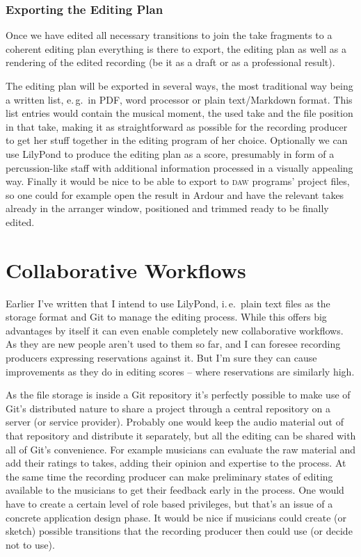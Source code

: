 \documentclass[11pt,a4paper]{article}
\begin{document}
\subsubsection{Exporting the Editing Plan}

Once we have edited all necessary transitions to join the take fragments to a
coherent editing plan everything is there to export, the editing plan as well as
a rendering of the edited recording (be it as a draft or as a professional
result).

The editing plan will be exported in several ways, the most traditional way
being a written list, e.\,g.\ in PDF, word processor or plain text/Markdown
format.
This list entries would contain the musical moment, the used take and the file
position in that take, making it as straightforward as possible for the
recording producer to get her stuff together in the editing program of her
choice.
Optionally we can use LilyPond to produce the editing plan as a score,
presumably in form of a percussion-like staff with additional information
processed in a visually appealing way.
Finally it would be nice to be able to export to \textsc{daw} programs' project
files, so one could for example open the result in Ardour and have the relevant
takes already in the arranger window, positioned and trimmed ready to be finally
edited.

\section{Collaborative Workflows}

Earlier I've written that I intend to use LilyPond, i.\,e.\ plain text files as
the storage format and Git to manage the editing process.
While this offers big advantages by itself it can even enable completely new
collaborative workflows.
As they are new people aren't used to them so far, and I can foresee recording
producers expressing reservations against it.
But I'm sure they can cause improvements as they do in editing scores -- where
reservations are similarly high.

As the file storage is inside a Git repository it's perfectly possible to make
use of Git's distributed nature to share a project through a central repository
on a server (or service provider).
Probably one would keep the audio material out of that repository and distribute
it separately, but all the editing can be shared with all of Git's convenience.
For example musicians can evaluate the raw material and add their ratings to
takes, adding their opinion and expertise to the process.
At the same time the recording producer can make preliminary states of editing
available to the musicians to get their feedback early in the process.
One would have to create a certain level of role based privileges, but that's an
issue of a concrete application design phase.
It would be nice if musicians could create (or sketch) possible transitions that
the recording producer then could use (or decide not to use).
\end{document}
